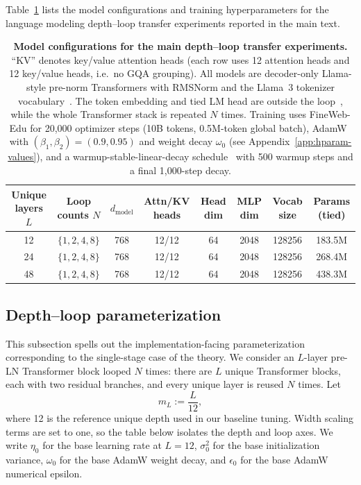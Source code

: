 Table~\ref{tab:lm-model-config} lists the model configurations and training hyperparameters for the language modeling depth--loop transfer experiments reported in the main text.

\begin{table}[t]
\centering
\footnotesize
\setlength{\tabcolsep}{4pt}
\begin{tabular}{@{}cccccccc@{}}
\toprule
Unique layers $L$ & Loop counts $N$ & $d_{\mathrm{model}}$ & Attn/KV heads & Head dim & MLP dim & Vocab size & Params (tied) \\
\midrule
12 & $\{1,2,4,8\}$ & 768 & 12/12 & 64 & 2048 & 128256 & 183.5M \\
24 & $\{1,2,4,8\}$ & 768 & 12/12 & 64 & 2048 & 128256 & 268.4M \\
48 & $\{1,2,4,8\}$ & 768 & 12/12 & 64 & 2048 & 128256 & 438.3M \\
\bottomrule
\end{tabular}
\caption{
\textbf{Model configurations for the main depth--loop transfer experiments.}
``KV'' denotes key/value attention heads (each row uses 12 attention heads and 12 key/value heads, i.e.\ no GQA grouping).
All models are decoder-only Llama-style pre-norm Transformers with RMSNorm and the Llama~3 tokenizer vocabulary~\citep{DBLP:conf/nips/VaswaniSPUJGKP17,DBLP:journals/corr/abs-2302-13971,dubey2024llama,DBLP:conf/icml/XiongYHZZXZLWL20,DBLP:conf/nips/ZhangS19a}.
The token embedding and tied LM head are outside the loop~\citep{DBLP:conf/eacl/PressW17}, while the whole Transformer stack is repeated $N$ times.
Training uses FineWeb-Edu for 20{,}000 optimizer steps (10B tokens, 0.5M-token global batch), AdamW~\citep{DBLP:conf/iclr/LoshchilovH19} with $(\beta_1,\beta_2)=(0.9,0.95)$ and weight decay $\omega_0$ (see Appendix~\ref{app:hparam-values}), and a warmup-stable-linear-decay schedule~\citep{DBLP:journals/corr/abs-2410-05192} with 500 warmup steps and a final 1{,}000-step decay.
}
\label{tab:lm-model-config}
\end{table}

\subsection{Depth--loop parameterization}
\label{app:completep-loop-table}

This subsection spells out the implementation-facing parameterization
corresponding to the single-stage case of the theory.  We consider an
$L$-layer pre-LN Transformer block looped $N$ times: there are $L$ unique Transformer blocks, each with two residual branches, and every unique layer is reused $N$ times.  Let
\[
  m_L := \frac{L}{12},
\]
where 12 is the reference unique depth used in our baseline tuning.  Width
scaling terms are set to one, so the table below isolates the depth and loop
axes.  We write $\eta_0$ for the base learning rate at $L=12$,
$\sigma_0^2$ for the base initialization variance, $\omega_0$ for the base
AdamW weight decay, and $\epsilon_0$ for the base AdamW numerical epsilon.

